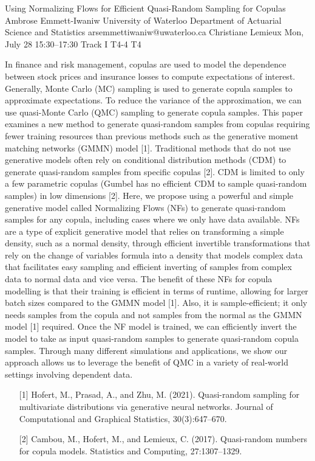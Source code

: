 \begin{talk}
  {Using Normalizing Flows for Efficient Quasi-Random Sampling for Copulas}%
  {Ambrose Emmett-Iwaniw}%
  {University of Waterloo Department of Actuarial Science and Statistics}%
  {arsemmettiwaniw@uwaterloo.ca}%
  {Christiane Lemieux}%
  {}%
  {Mon, July 28 15:30–17:30 Track I}%
  {T4-4}%
  {T4}%
  
				
			
In finance and risk management, copulas are used to model the dependence between stock prices and insurance losses to compute expectations of interest. Generally, Monte Carlo (MC) sampling is used to generate copula samples to approximate expectations. To reduce the variance of the approximation, we can use quasi-Monte Carlo (QMC) sampling to generate copula samples. This paper examines a new method to generate quasi-random samples from copulas requiring fewer training resources than previous methods such as the generative moment matching networks (GMMN) model [1]. Traditional methods that do not use generative models often rely on conditional distribution methods (CDM) to generate quasi-random samples from specific copulas [2]. CDM is limited to only a few parametric copulas (Gumbel has no efficient CDM to sample quasi-random samples) in low dimensions [2]. Here, we propose using a powerful and simple generative model called Normalizing Flows (NFs) to generate quasi-random samples for any copula, including cases where we only have data available. NFs are a type of explicit generative model that relies on transforming a simple density, such as a normal density, through efficient invertible transformations that rely on the change of variables formula into a density that models complex data that facilitates easy sampling and efficient inverting of samples from complex data to normal data and vice versa. The benefit of these NFs for copula modelling is that their training is efficient in terms of runtime, allowing for larger batch sizes compared to the GMMN model [1]. Also, it is sample-efficient; it only needs samples from the copula and not samples from the normal as the GMMN model [1] required. Once the NF model is trained, we can efficiently invert the model to take as input quasi-random samples to generate quasi-random copula samples. Through many different simulations and applications, we show our approach allows us to leverage the benefit of QMC in a variety of real-world settings involving dependent data.
\medskip

\begin{enumerate}
	\item[{[1]}] Hofert, M., Prasad, A., and Zhu, M. (2021). Quasi-random sampling for multivariate distributions via generative neural networks. Journal of Computational and Graphical Statistics,
30(3):647–670.
	\item[{[2]}] Cambou, M., Hofert, M., and Lemieux, C. (2017). Quasi-random numbers for copula models. Statistics and Computing, 27:1307–1329. 
\end{enumerate}
\end{talk}

